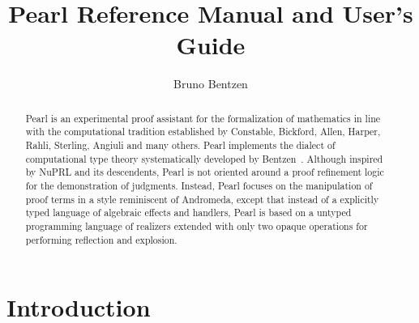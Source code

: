 \documentclass[a4paper]{article}
\title{\bfseries{Pearl Reference Manual and User's Guide}}
\author[1]{Bruno Bentzen}
\affil[1]{Zhejiang University, \protect\\ Hangzhou, 310058, P. R. China}
\affil[ ]{\texttt{bbentzen@zju.edu.cn}}
\date{}
\begin{document}
	
\maketitle


\begin{abstract}
	\noindent Pearl is an experimental proof assistant for the formalization of mathematics in line with the computational tradition established by Constable, Bickford, Allen, Harper, Rahli, Sterling, Angiuli and many others. Pearl implements the dialect of computational type theory systematically developed by Bentzen~\cite{bentzen2026book}. Although inspired by NuPRL and its descendents, Pearl is not oriented around a proof refinement logic for the demonstration of judgments. Instead, Pearl focuses on the manipulation of proof terms in a style reminiscent of Andromeda, except that instead of a explicitly typed language of algebraic effects and handlers, Pearl is based on a untyped programming language of realizers extended with only two opaque operations for performing reflection and explosion. 
\end{abstract}


\section{Introduction} \label{intro}
\end{document}
